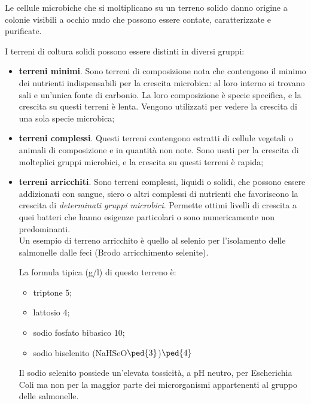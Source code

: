 \documentclass[11pt]{book}
\begin{document}
Le cellule microbiche che si moltiplicano su un terreno solido danno origine a colonie visibili a occhio nudo che possono essere contate, caratterizzate e purificate.

I terreni di coltura solidi possono essere distinti in diversi gruppi:
\begin{itemize}
\item \textbf{terreni minimi}. Sono terreni di composizione nota che contengono il minimo dei nutrienti indispensabili per la crescita microbica: al loro interno si trovano sali e un'unica fonte di carbonio. La loro composizione è specie specifica, e la crescita su questi terreni è lenta. Vengono utilizzati per vedere la crescita di una sola specie microbica;
\item \textbf{terreni complessi}. Questi terreni contengono estratti di cellule vegetali o animali di composizione e in quantità non note. Sono usati per la crescita di molteplici gruppi microbici, e la crescita su questi terreni è rapida;
\item \textbf{terreni arricchiti}. Sono terreni complessi, liquidi o solidi, che possono essere addizionati con sangue, siero o altri complessi di nutrienti che favoriscono la crescita di \emph{determinati gruppi microbici}. Permette ottimi livelli di crescita a quei batteri che hanno esigenze particolari o sono numericamente non predominanti.\\ 
Un esempio di terreno arricchito è quello al selenio per l’isolamento delle salmonelle dalle feci (Brodo arricchimento selenite).

La formula tipica (g/l) di questo terreno è:
\begin{itemize}
\item triptone 5;
\item lattosio 4;
\item sodio fosfato bibasico 10;
\item sodio biselenito (NaHSeO$\ped{3}$)$\ped{4}$
\end{itemize}

Il sodio selenito possiede un'elevata tossicità, a pH neutro, per Escherichia Coli ma non per la maggior parte dei microrganismi appartenenti al gruppo delle salmonelle.


\end{itemize}
\end{document}

